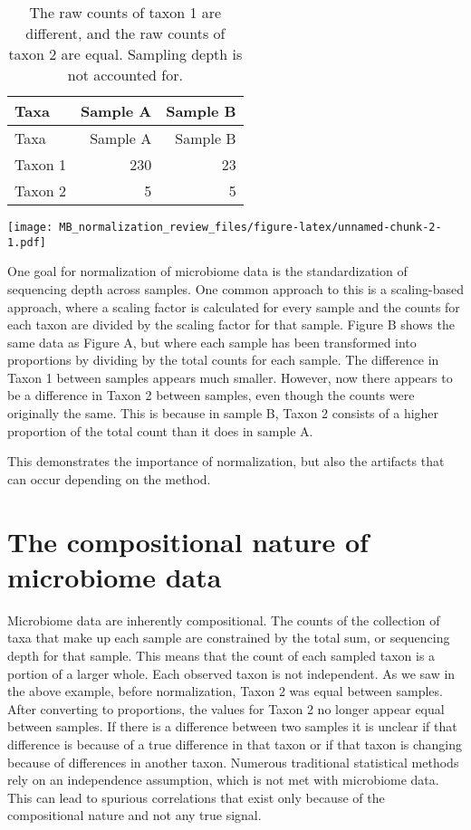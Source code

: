\documentclass[
]{book}
\begin{document}
\begin{longtable}[]{@{}lrr@{}}
\caption{\label{tab:unnamed-chunk-1}The raw counts of taxon 1 are different, and the raw counts of taxon 2 are equal. Sampling depth is not accounted for.}\tabularnewline
\toprule
Taxa & Sample A & Sample B\tabularnewline
\midrule
\endfirsthead
\toprule
Taxa & Sample A & Sample B\tabularnewline
\midrule
\endhead
Taxon 1 & 230 & 23\tabularnewline
Taxon 2 & 5 & 5\tabularnewline
\bottomrule
\end{longtable}

\texttt{[image: MB\_normalization\_review\_files/figure-latex/unnamed-chunk-2-1.pdf]}

One goal for normalization of microbiome data is the standardization of sequencing depth across samples. One common approach to this is a scaling-based approach, where a scaling factor is calculated for every sample and the counts for each taxon are divided by the scaling factor for that sample. Figure B shows the same data as Figure A, but where each sample has been transformed into proportions by dividing by the total counts for each sample. The difference in Taxon 1 between samples appears much smaller. However, now there appears to be a difference in Taxon 2 between samples, even though the counts were originally the same. This is because in sample B, Taxon 2 consists of a higher proportion of the total count than it does in sample A.

This demonstrates the importance of normalization, but also the artifacts that can occur depending on the method.

\hypertarget{the-compositional-nature-of-microbiome-data}{%
\section{The compositional nature of microbiome data}\label{the-compositional-nature-of-microbiome-data}}

Microbiome data are inherently compositional. The counts of the collection of taxa that make up each sample are constrained by the total sum, or sequencing depth for that sample. This means that the count of each sampled taxon is a portion of a larger whole. Each observed taxon is not independent. As we saw in the above example, before normalization, Taxon 2 was equal between samples. After converting to proportions, the values for Taxon 2 no longer appear equal between samples. If there is a difference between two samples it is unclear if that difference is because of a true difference in that taxon or if that taxon is changing because of differences in another taxon. Numerous traditional statistical methods rely on an independence assumption, which is not met with microbiome data. This can lead to spurious correlations that exist only because of the compositional nature and not any true signal.
\end{document}

